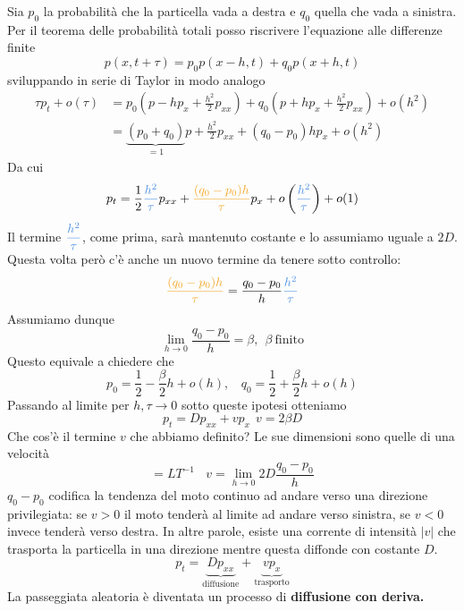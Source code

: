 \documentclass[10pt,a4paper,twoside,openright]{book}
\begin{document}
Sia $\displaystyle p_{0}$ la probabilità che la particella vada a destra e $\displaystyle q_{0}$ quella che vada a sinistra. Per il teorema delle probabilità totali posso riscrivere l'equazione alle differenze finite
\begin{equation*}
p(x,t+\tau) =p_{0} p(x-h,t) +q_{0} p(x+h,t)
\end{equation*}
sviluppando in serie di Taylor in modo analogo
\begin{align*}
\tau p_{t} +o(\tau) & =p_{0}\left( p-hp_{x} +\frac{h^{2}}{2} p_{xx}\right) +q_{0}\left( p+hp_{x} +\frac{h^{2}}{2} p_{xx}\right) +o\left(h^{2}\right)\\
 & =\underbrace{(p_{0} +q_{0})}_{=1} p+\frac{h^{2}}{2} p_{xx} +(q_{0} -p_{0}) hp_{x} +o\left(h^{2}\right)
\end{align*}
Da cui
\begin{equation*}
p_{t} =\frac{1}{2}\textcolor[rgb]{0.29,0.56,0.89}{\frac{h^{2}}{\tau }} p_{xx} +\textcolor[rgb]{0.96,0.65,0.14}{\frac{(q_{0} -p_{0}) h}{\tau }} p_{x} +o\left(\textcolor[rgb]{0.29,0.56,0.89}{\frac{h^{2}}{\tau }}\right) +o(1)
\end{equation*}
Il termine $\displaystyle \textcolor[rgb]{0.29,0.56,0.89}{\frac{h^{2}}{\tau }}$, come prima, sarà mantenuto costante e lo assumiamo uguale a $\displaystyle 2D$. Questa volta però c'è anche un nuovo termine da tenere sotto controllo:
\begin{equation*}
\textcolor[rgb]{0.96,0.65,0.14}{\frac{(q_{0} -p_{0}) h}{\tau }}=\frac{q_{0} -p_{0}}{h}\textcolor[rgb]{0.29,0.56,0.89}{\frac{h^{2}}{\tau }}
\end{equation*}
Assumiamo dunque 
\begin{equation}
\lim _{h\rightarrow 0}\frac{q_{0} -p_{0}}{h}=\beta,\ \ \beta \ \text{finito}
\end{equation}
Questo equivale a chiedere che
\begin{equation*}
p_{0} =\frac{1}{2} -\frac{\beta }{2} h+o( h) ,\ \ \ \ q_{0} =\frac{1}{2} +\frac{\beta }{2} h+o( h)
\end{equation*}
Passando al limite per $\displaystyle h,\tau \rightarrow 0$ sotto queste ipotesi otteniamo
\begin{equation*}
\boxed{p_{t} =Dp_{xx} +vp_{x}} \ \ v=2\beta D
\end{equation*}
Che cos'è il termine $\displaystyle v$ che abbiamo definito? Le sue dimensioni sono quelle di una velocità
\begin{equation*}
[ v] =LT^{-1} \ \ \ \ v=\lim _{h\rightarrow 0} 2D\frac{q_{0} -p_{0}}{h}
\end{equation*}
$\displaystyle q_{0} -p_{0}$ codifica la tendenza del moto continuo ad andare verso una direzione privilegiata: se $\displaystyle v >0$ il moto tenderà al limite ad andare verso sinistra, se $\displaystyle v< 0$ invece tenderà verso destra. In altre parole, esiste una corrente di intensità $\displaystyle | v| $ che trasporta la particella in una direzione mentre questa diffonde con costante $\displaystyle D$.
\begin{equation*}
	p_{t} = \underbrace{Dp_{xx}}_{\text{diffusione}}   +  \underbrace{vp_{x}}_{\text{trasporto}}
\end{equation*}
La passeggiata aleatoria è diventata un processo di \textbf{diffusione con deriva.}
\end{document}
